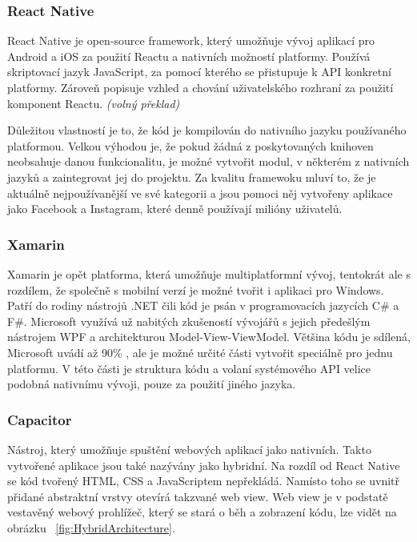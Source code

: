 \documentclass[
  biblatex,
  glossaries,
  index
]{kidiplom}
\begin{document}
\subsubsection{React Native}
React Native je open-source framework, který umožňuje vývoj aplikací pro Android a iOS za použití Reactu a nativních možností platformy. Používá skriptovací jazyk JavaScript, za pomocí kterého se přistupuje k API konkretní platformy. Zároveň popisuje vzhled a chování  uživatelského rozhraní za použití komponent Reactu.
\cite{3}
\textit{(volný překlad)}

Důležitou vlastností je to, že kód je kompilován do nativního jazyku používaného platformou. Velkou výhodou je, že pokud žádná z poskytovaných knihoven neobsahuje danou funkcionalitu, je možné vytvořit modul, v některém z nativních jazyků a zaintegrovat jej do projektu. Za kvalitu framewoku mluví to, že je aktuálně nejpoužívanější ve své kategorii a jsou pomoci něj vytvořeny aplikace jako Facebook a Instagram, které denně používají milióny uživatelů.

\subsubsection{Xamarin}
Xamarin je opět platforma, která umožňuje multiplatformní vývoj, tentokrát ale s rozdílem, že společně s mobilní verzí je možné tvořit i aplikaci pro Windows. Patří do rodiny nástrojů .NET čili kód je psán v programovacích jazycích C\# a F\#. Microsoft využívá už nabitých zkušeností vývojářů s jejich předešlým nástrojem WPF a architekturou Model-View-ViewModel. Většina kódu je sdílená, Microsoft uvádí až 90\% \cite{4}, ale je možné určité části vytvořit speciálně pro jednu platformu. V této části je struktura kódu a volaní systémového API velice podobná nativnímu vývoji, pouze za použití jiného jazyka.

\subsubsection{Capacitor}
Nástroj, který umožňuje spuštění webových aplikací jako nativních. Takto vytvořené aplikace jsou také nazývány jako hybridní. Na rozdíl od React Native se kód tvořený HTML, CSS a JavaScriptem nepřekládá. Namísto toho se uvnitř přidané abstraktní vrstvy otevírá takzvané web view. Web view je v podstatě vestavěný webový prohlížeč, který se stará o běh a zobrazení kódu, lze vidět na obrázku ~\ref{fig:HybridArchitecture}.  
\end{document}

